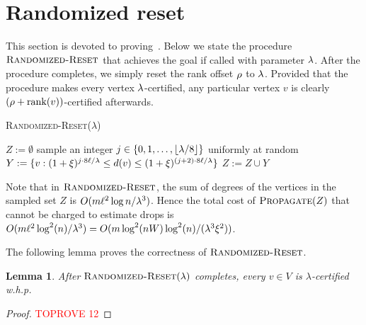 \documentclass[11pt,letterpaper]{article}
\theoremstyle{plain}
\newtheorem{lemma}[theorem]{Lemma}
\renewcommand{\O}{O}
\DeclareMathOperator*{\rank}{rank}
\DeclareMathOperator*{\PD}{\textsc{Propagate}}
\begin{document}
\section{Randomized reset}\label{a:reset}
This section is devoted to proving~.
Below we state the procedure $\textsc{Randomized-Reset}$ that achieves the goal if called with parameter $\lambda$.
After the procedure completes, we simply reset the rank offset $\rho$ to $\lambda$.
Provided that the procedure makes every vertex $\lambda$-certified, any particular vertex $v$ is clearly
$(\roff+\rank(v))$-certified afterwards.

\begin{algorithm}[h!]
  \caption{\textsc{Randomized-Reset}($\lambda$)}\label{alg:batch-update}
  \begin{algorithmic}[1]
    \State $Z:=\emptyset$
      \State sample an integer $j\in \{0,1,\ldots,\lfloor \lambda/8\rfloor\}$ uniformly at random
      \State $Y:=\{v:(1+\xi)^{j\cdot 8\ell/\lambda}\leq d(v)\leq (1+\xi)^{(j+2)\cdot 8\ell/\lambda}\}$ \Comment{compute $Y$ only if $\deg(Y)=\O(m\ell/\bal^2)$}
        \State $Z:=Z\cup Y$
      \EndIf
    \EndFor
    \State {}
  \end{algorithmic}
\end{algorithm}
Note that in $\textsc{Randomized-Reset}$,
the sum of degrees of the vertices in the sampled set $Z$ is $\O(m\ell^2\log{n}/\bal^3)$.
Hence the total cost of $\PD(Z)$ that cannot be charged to estimate drops
is $\O(m\ell^2\log^2(n)/\bal^3)=\O(m\log^2(nW)\log^2(n)/(\bal^3\epsp^2))$.


The following lemma proves the correctness of $\textsc{Randomized-Reset}$.
\begin{lemma}\label{l:batch-insert-correct}
  After $\textsc{Randomized-Reset}(\lambda)$ completes, every $v\in V$ is $\lambda$-certified
  w.h.p.
\end{lemma}

\begin{proof}\textcolor{red}{TOPROVE 12}\end{proof}

\clearpage


\end{document}
